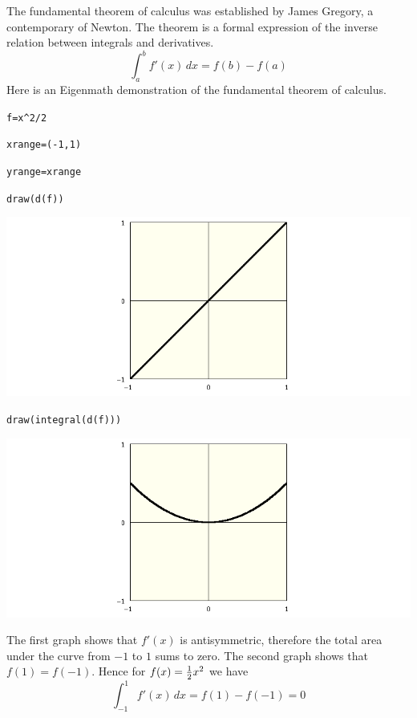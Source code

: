 
\newpage


\noindent
The fundamental theorem of calculus was established by James Gregory,
a contemporary of Newton.
The theorem is a formal expression of the inverse relation between
integrals and derivatives.
$$\int_a^b f'(x)\,dx=f(b)-f(a)$$
Here is an Eigenmath demonstration of the fundamental theorem of calculus.

\medskip
\verb$f=x^2/2$

\verb$xrange=(-1,1)$

\verb$yrange=xrange$

\verb$draw(d(f))$
\begin{center}
\includegraphics[scale=0.4]{funda1.png}
\end{center}

\verb$draw(integral(d(f)))$

\begin{center}
\includegraphics[scale=0.4]{funda2.png}
\end{center}

\noindent
The first graph shows that $f'(x)$ is antisymmetric, therefore the total
area under the curve from $-1$ to $1$ sums to zero.
The second graph shows that $f(1)=f(-1)$.
Hence for $f(x)={1\over2}x^2$ we have
$$\int_{-1}^1f'(x)\,dx=f(1)-f(-1)=0$$

